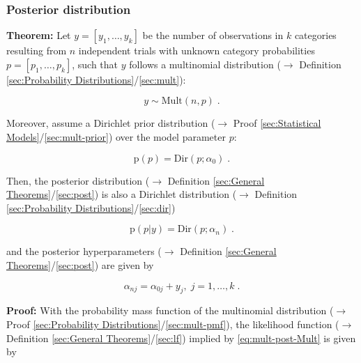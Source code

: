 \documentclass[a4paper,12pt,twoside]{book}
\begin{document}
\subsubsection[\textbf{Posterior distribution}]{Posterior distribution} \label{sec:mult-post}
\setcounter{equation}{0}

\textbf{Theorem:} Let $y = [y_1, \ldots, y_k]$ be the number of observations in $k$ categories resulting from $n$ independent trials with unknown category probabilities $p = [p_1, \ldots, p_k]$, such that $y$ follows a multinomial distribution ($\rightarrow$ Definition \ref{sec:Probability Distributions}/\ref{sec:mult}):

\begin{equation} \label{eq:mult-post-Mult}
y \sim \mathrm{Mult}(n,p) \; .
\end{equation}

Moreover, assume a Dirichlet prior distribution ($\rightarrow$ Proof \ref{sec:Statistical Models}/\ref{sec:mult-prior}) over the model parameter $p$:

\begin{equation} \label{eq:mult-post-Mult-prior}
\mathrm{p}(p) = \mathrm{Dir}(p; \alpha_0) \; .
\end{equation}

Then, the posterior distribution ($\rightarrow$ Definition \ref{sec:General Theorems}/\ref{sec:post}) is also a Dirichlet distribution ($\rightarrow$ Definition \ref{sec:Probability Distributions}/\ref{sec:dir})

\begin{equation} \label{eq:mult-post-Mult-post}
\mathrm{p}(p|y) = \mathrm{Dir}(p; \alpha_n) \; .
\end{equation}

and the posterior hyperparameters ($\rightarrow$ Definition \ref{sec:General Theorems}/\ref{sec:post}) are given by

\begin{equation} \label{eq:mult-post-Mult-post-par}
\alpha_{nj} = \alpha_{0j} + y_j, \; j = 1,\ldots,k \; .
\end{equation}


\vspace{1em}
\textbf{Proof:} With the probability mass function of the multinomial distribution ($\rightarrow$ Proof \ref{sec:Probability Distributions}/\ref{sec:mult-pmf}), the likelihood function ($\rightarrow$ Definition \ref{sec:General Theorems}/\ref{sec:lf}) implied by \eqref{eq:mult-post-Mult} is given by
\end{document}
